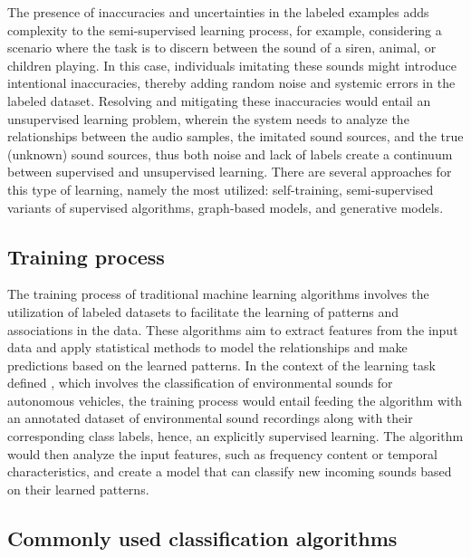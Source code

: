 The presence of inaccuracies and uncertainties in the labeled examples adds complexity to the semi-supervised learning process, for example, considering a scenario where the task is to discern between the sound of a siren, animal, or children playing. In this case, individuals imitating these sounds might introduce intentional inaccuracies, thereby adding random noise and systemic errors in the labeled dataset. Resolving and mitigating these inaccuracies would entail an unsupervised learning problem, wherein the system needs to analyze the relationships between the audio samples, the imitated sound sources, and the true (unknown) sound sources, thus both noise and lack of labels create a continuum between supervised and unsupervised learning. There are several approaches for this type of learning, namely the most utilized: self-training, semi-supervised variants of supervised algorithms, graph-based models, and generative models.


\subsection{Training process}
\label{subsec:machine_learning_training}

The training process of traditional machine learning algorithms involves the utilization of labeled datasets to facilitate the learning of patterns and associations in the data. These algorithms aim to extract features from the input data and apply statistical methods to model the relationships and make predictions based on the learned patterns. In the context of the learning task defined \cite{Mitchell1997}, which involves the classification of environmental sounds for autonomous vehicles, the training process would entail feeding the algorithm with an annotated dataset of environmental sound recordings along with their corresponding class labels, hence, an explicitly supervised learning. The algorithm would then analyze the input features, such as frequency content or temporal characteristics, and create a model that can classify new incoming sounds based on their learned patterns.


\subsection{Commonly used classification algorithms}
\label{subsec:machine_learning_common_classification}

